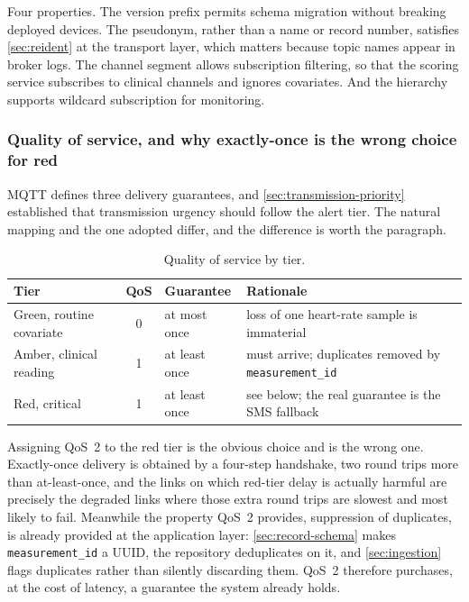 \documentclass[12pt,a4paper,oneside]{report}
\begin{document}
Four properties. The version prefix permits schema migration without breaking deployed devices. The pseudonym, rather than a name or record number, satisfies \cref{sec:reident} at the transport layer, which matters because topic names appear in broker logs. The channel segment allows subscription filtering, so that the scoring service subscribes to clinical channels and ignores covariates. And the hierarchy supports wildcard subscription for monitoring.

\subsubsection{Quality of service, and why exactly-once is the wrong choice for red}\label{sec:qos}

MQTT defines three delivery guarantees, and \cref{sec:transmission-priority} established that transmission urgency should follow the alert tier. The natural mapping and the one adopted differ, and the difference is worth the paragraph.

\begin{table}[htbp]
\centering\small
\caption{Quality of service by tier.}\label{tab:qos}
\begin{tabularx}{\textwidth}{@{}>{\raggedright\arraybackslash}p{3.2cm} c >{\raggedright\arraybackslash}p{2.6cm} X@{}}
\toprule
\textbf{Tier} & \textbf{QoS} & \textbf{Guarantee} & \textbf{Rationale} \\
\midrule
Green, routine covariate & 0 & at most once & loss of one heart-rate sample is immaterial \\
Amber, clinical reading & 1 & at least once & must arrive; duplicates removed by \texttt{measurement\_id} \\
Red, critical & 1 & at least once & see below; the real guarantee is the SMS fallback \\
\bottomrule
\end{tabularx}
\end{table}

Assigning QoS~2 to the red tier is the obvious choice and is the wrong one. Exactly-once delivery is obtained by a four-step handshake, two round trips more than at-least-once, and the links on which red-tier delay is actually harmful are precisely the degraded links where those extra round trips are slowest and most likely to fail. Meanwhile the property QoS~2 provides, suppression of duplicates, is already provided at the application layer: \cref{sec:record-schema} makes \texttt{measurement\_id} a UUID, the repository deduplicates on it, and \cref{sec:ingestion} flags duplicates rather than silently discarding them. QoS~2 therefore purchases, at the cost of latency, a guarantee the system already holds.
\end{document}
